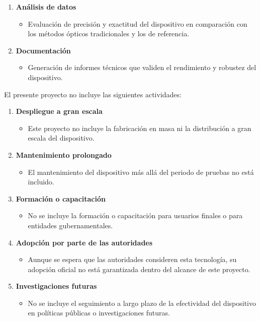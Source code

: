 \begin{enumerate}[label=\alph*)]
	\item \textbf{Análisis de datos}
	\begin{itemize}
		\item Evaluación de precisión y exactitud del dispositivo en comparación con los métodos ópticos tradicionales y los de referencia.
	\end{itemize}
	
	\item \textbf{Documentación}
	\begin{itemize}
		\item Generación de informes técnicos que validen el rendimiento y robustez del dispositivo.
	\end{itemize}
	
\end{enumerate}

El presente proyecto no incluye las siguientes actividades:

\begin{enumerate}[label=\alph*)]
	
	\item \textbf{Despliegue a gran escala}
	\begin{itemize}
		\item Este proyecto no incluye la fabricación en masa ni la distribución a gran escala del dispositivo.
	\end{itemize}
	
	\item \textbf{Mantenimiento prolongado}
	\begin{itemize}
		\item El mantenimiento del dispositivo más allá del periodo de pruebas no está incluido.
	\end{itemize}
	
	\item \textbf{Formación o capacitación}
	\begin{itemize}
		\item No se incluye la formación o capacitación para usuarios finales o para entidades gubernamentales.
	\end{itemize}
	
	\item \textbf{Adopción por parte de las autoridades}
	\begin{itemize}
		\item Aunque se espera que las autoridades consideren esta tecnología, su adopción oficial no está garantizada dentro del alcance de este proyecto.
	\end{itemize}
	
	\item \textbf{Investigaciones futuras}
	\begin{itemize}
		\item No se incluye el seguimiento a largo plazo de la efectividad del dispositivo en políticas públicas o investigaciones futuras.
	\end{itemize}
	
\end{enumerate}


